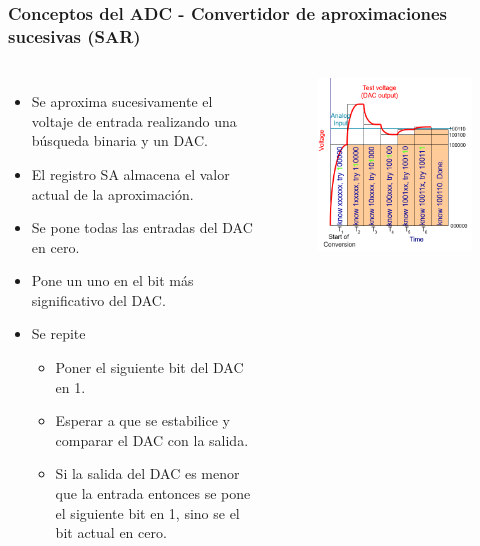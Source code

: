 \documentclass[10.5pt,scale=1.0,t,aspectratio=169,hyperref={pdfpagelabels=false}]{beamer}
\begin{document}
\begin{frame}
	\frametitle{Conceptos del ADC - Convertidor de aproximaciones sucesivas (SAR)}
	{\small
		\begin{columns}
			\begin{itemize}
				\setlength\itemsep{0cm}
				\item Se aproxima sucesivamente el voltaje de entrada realizando una búsqueda binaria y un DAC. 
				\item El registro SA almacena el valor actual de la aproximación.
				\item Se pone todas las entradas del DAC en cero.
				\item Pone un uno en el bit más significativo del DAC.
				\item Se repite
				\begin{itemize}
					\item Poner el siguiente bit del DAC en 1.
					\item Esperar a que se estabilice y comparar el DAC con la salida.
					\item Si la salida del DAC es menor que la entrada entonces se pone el siguiente bit en 1, sino se el bit actual en cero. 
				\end{itemize}
			\end{itemize}
			
			\begin{figure}
				\centering\includegraphics[scale=0.45]{fig_SARConversion}
			\end{figure}
			
		\end{columns}
	}	
\end{frame}
\end{document}
